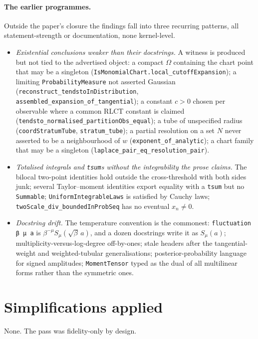 \documentclass[11pt]{article}
\begin{document}
\paragraph{The earlier programmes.} Outside the paper's closure the findings fall into three recurring patterns, all statement-strength or documentation, none kernel-level.
\begin{itemize}[nosep]
\item \emph{Existential conclusions weaker than their docstrings.} A witness is produced but not tied to the advertised object: a compact $\Omega$ containing the chart point that may be a singleton (\texttt{IsMonomialChart.local\_cutoffExpansion}); a limiting \texttt{ProbabilityMeasure} not asserted Gaussian (\texttt{reconstruct\_tendstoInDistribution}, \texttt{assembled\_expansion\_of\_tangential}); a constant $c>0$ chosen per observable where a common RLCT constant is claimed (\texttt{tendsto\_normalised\_partitionObs\_equal}); a tube of unspecified radius (\texttt{coordStratumTube}, \texttt{stratum\_tube}); a partial resolution on a set $N$ never asserted to be a neighbourhood of $w$ (\texttt{exponent\_of\_analytic}); a chart family that may be a singleton (\texttt{laplace\_pair\_eq\_resolution\_pair}).
\item \emph{Totalised integrals and \texttt{tsum}s without the integrability the prose claims.} The bilocal two-point identities hold outside the cross-threshold with both sides junk; several Taylor--moment identities export equality with a \texttt{tsum} but no \texttt{Summable}; \texttt{UniformIntegrableLaws} is satisfied by Cauchy laws; \texttt{twoScale\_div\_boundedInProbSeq} has no eventual $x_n\ne0$.
\item \emph{Docstring drift.} The temperature convention is the commonest: \texttt{fluctuation β μ a} is $\beta^{-\mu}S_\mu(\sqrt\beta\,a)$, and a dozen docstrings write it as $S_\mu(a)$; multiplicity-versus-log-degree off-by-ones; stale headers after the tangential-weight and weighted-tubular generalisations; posterior-probability language for signed amplitudes; \texttt{MomentTensor} typed as the dual of all multilinear forms rather than the symmetric ones.
\end{itemize}

\section{Simplifications applied}

None. The pass was fidelity-only by design.
\end{document}
